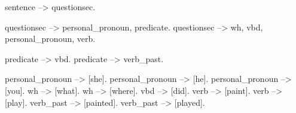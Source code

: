 sentence --> questionsec.

questionsec --> personal_pronoun, predicate.
questionsec --> wh, vbd, personal_pronoun, verb.

predicate --> vbd.
predicate --> verb_past.

personal_pronoun --> [she].
personal_pronoun --> [he].
personal_pronoun --> [you].
wh --> [what].
wh --> [where].
vbd --> [did].
verb --> [paint].
verb --> [play].
verb_past --> [painted].
verb_past --> [played].

